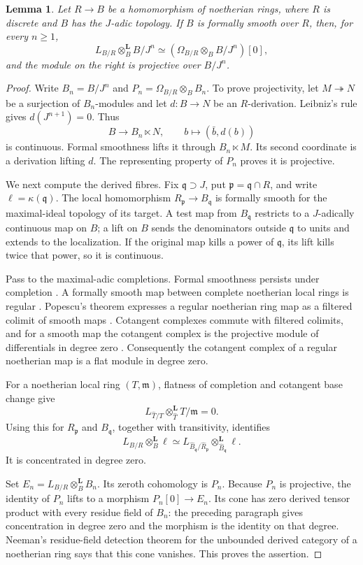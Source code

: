 \documentclass[11pt]{article}
\newtheorem{lemma}[theorem]{Lemma}
\theoremstyle{definition}\newtheorem{definition}[theorem]{Definition}
\theoremstyle{remark}\newtheorem{remark}[theorem]{Remark}
\begin{document}
\begin{lemma}\label{lem:adiccotangent}
Let $R\to B$ be a homomorphism of noetherian rings, where $R$ is discrete and $B$ has the $J$-adic topology. If $B$ is formally smooth over $R$, then, for every $n\geq1$,
\[
 L_{B/R}\otimes_B^{\mathbf L}B/J^n
 \simeq (\Omega_{B/R}\otimes_B B/J^n)[0],
\]
and the module on the right is projective over $B/J^n$.
\end{lemma}
\begin{proof}
Write $B_n=B/J^n$ and $P_n=\Omega_{B/R}\otimes_BB_n$. To prove projectivity, let $M\twoheadrightarrow N$ be a surjection of $B_n$-modules and let $d:B\to N$ be an $R$-derivation. Leibniz's rule gives $d(J^{n+1})=0$. Thus
\[
 B\longrightarrow B_n\ltimes N,\qquad b\longmapsto(\bar b,d(b))
\]
is continuous. Formal smoothness lifts it through $B_n\ltimes M$. Its second coordinate is a derivation lifting $d$. The representing property of $P_n$ proves it is projective.

We next compute the derived fibres. Fix $\mathfrak q\supset J$, put $\mathfrak p=\mathfrak q\cap R$, and write $\ell=\kappa(\mathfrak q)$. The local homomorphism $R_\mathfrak p\to B_\mathfrak q$ is formally smooth for the maximal-ideal topology of its target. A test map from $B_\mathfrak q$ restricts to a $J$-adically continuous map on $B$; a lift on $B$ sends the denominators outside $\mathfrak q$ to units and extends to the localization. If the original map kills a power of $\mathfrak q$, its lift kills twice that power, so it is continuous.

Pass to the maximal-adic completions. Formal smoothness persists under completion \cite[Tag 07ED]{Stacks}. A formally smooth map between complete noetherian local rings is regular \cite[Proposition 15.50.2]{Stacks}. Popescu's theorem expresses a regular noetherian ring map as a filtered colimit of smooth maps \cite[Tag 07GC]{Stacks}. Cotangent complexes commute with filtered colimits, and for a smooth map the cotangent complex is the projective module of differentials in degree zero \cite[Tags 08S9 and 08R5]{Stacks}. Consequently the cotangent complex of a regular noetherian map is a flat module in degree zero.

For a noetherian local ring $(T,\mathfrak m)$, flatness of completion and cotangent base change give
\[
 L_{\widehat T/T}\otimes_{\widehat T}^{\mathbf L}T/\mathfrak m=0.
\]
Using this for $R_\mathfrak p$ and $B_\mathfrak q$, together with transitivity, identifies
\[
 L_{B/R}\otimes_B^{\mathbf L}\ell
 \simeq L_{\widehat B_\mathfrak q/\widehat R_\mathfrak p}
           \otimes_{\widehat B_\mathfrak q}^{\mathbf L}\ell.
\]
It is concentrated in degree zero.

Set $E_n=L_{B/R}\otimes_B^{\mathbf L}B_n$. Its zeroth cohomology is $P_n$. Because $P_n$ is projective, the identity of $P_n$ lifts to a morphism $P_n[0]\to E_n$. Its cone has zero derived tensor product with every residue field of $B_n$: the preceding paragraph gives concentration in degree zero and the morphism is the identity on that degree. Neeman's residue-field detection theorem for the unbounded derived category of a noetherian ring \cite[Lemma 2.12, p.~527]{Neeman} says that this cone vanishes. This proves the assertion.
\end{proof}
\end{document}
